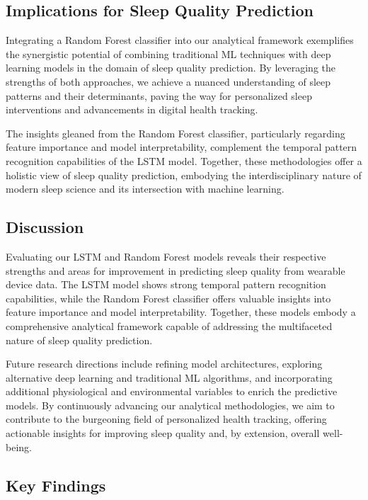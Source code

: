 \documentclass[10pt]{extarticle}
\begin{document}
\subsection{Implications for Sleep Quality Prediction}

Integrating a Random Forest classifier into our analytical framework exemplifies the synergistic potential of combining traditional ML techniques with deep learning models in the domain of sleep quality prediction. By leveraging the strengths of both approaches, we achieve a nuanced understanding of sleep patterns and their determinants, paving the way for personalized sleep interventions and advancements in digital health tracking.

The insights gleaned from the Random Forest classifier, particularly regarding feature importance and model interpretability, complement the temporal pattern recognition capabilities of the LSTM model. Together, these methodologies offer a holistic view of sleep quality prediction, embodying the interdisciplinary nature of modern sleep science and its intersection with machine learning.

\subsection{Discussion}

Evaluating our LSTM and Random Forest models reveals their respective strengths and areas for improvement in predicting sleep quality from wearable device data. The LSTM model shows strong temporal pattern recognition capabilities, while the Random Forest classifier offers valuable insights into feature importance and model interpretability. Together, these models embody a comprehensive analytical framework capable of addressing the multifaceted nature of sleep quality prediction.

Future research directions include refining model architectures, exploring alternative deep learning and traditional ML algorithms, and incorporating additional physiological and environmental variables to enrich the predictive models. By continuously advancing our analytical methodologies, we aim to contribute to the burgeoning field of personalized health tracking, offering actionable insights for improving sleep quality and, by extension, overall well-being.

\subsection{Key Findings}
\end{document}
